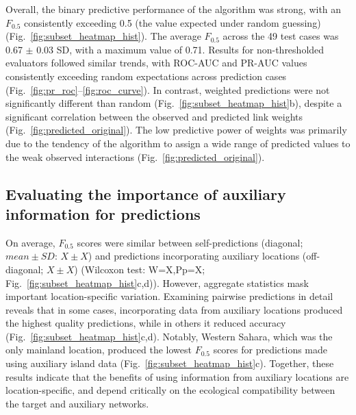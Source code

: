 \documentclass[oneside, a4paper, onecolumn, 11pt]{article}
\newcommand{\revtag}[1]{\textcolor{softcoral}{[#1]}}
\begin{document}
Overall, the binary predictive performance of the algorithm was strong, with an $F_{0.5}$ consistently exceeding 0.5 (the value expected under random guessing) (Fig.~\ref{fig:subset_heatmap_hist}). The average $F_{0.5}$ across the 49 test cases was 0.67 $\pm$ 0.03 SD, with a maximum value of 0.71. Results for non-thresholded evaluators followed similar trends, with ROC-AUC and PR-AUC values consistently exceeding random expectations across prediction cases (Fig.~\ref{fig:pr_roc}--\ref{fig:roc_curve}). %
In contrast, weighted predictions were not significantly different than random (Fig.~\ref{fig:subset_heatmap_hist}b), despite a significant correlation between the observed and predicted link weights (Fig.~\ref{fig:predicted_original}). The low predictive power of weights was primarily due to the tendency of the algorithm to assign a wide range of predicted values to the weak observed interactions (Fig.~\ref{fig:predicted_original}).

\subsection{Evaluating the importance of auxiliary information for predictions}

On average, $F_{0.5}$ scores were similar between self-predictions (diagonal; $mean \pm  SD$:
$X \pm X$) and predictions incorporating auxiliary locations (off-diagonal; $X \pm X$) (Wilcoxon test: W=X,Pp=X; Fig.~\ref{fig:subset_heatmap_hist}c,d)). However, aggregate statistics mask important location-specific variation. Examining pairwise predictions in detail reveals that in some cases, incorporating data from auxiliary locations produced the highest quality predictions, while in others it reduced accuracy (Fig.~\ref{fig:subset_heatmap_hist}c,d). Notably, Western Sahara, which was the only mainland location, produced the lowest $F_{0.5}$ scores for predictions made using auxiliary island data (Fig.~\ref{fig:subset_heatmap_hist}c). Together, these results indicate that the benefits of using information from auxiliary locations are location-specific, and depend critically on the ecological compatibility between the target and auxiliary networks.
\end{document}
